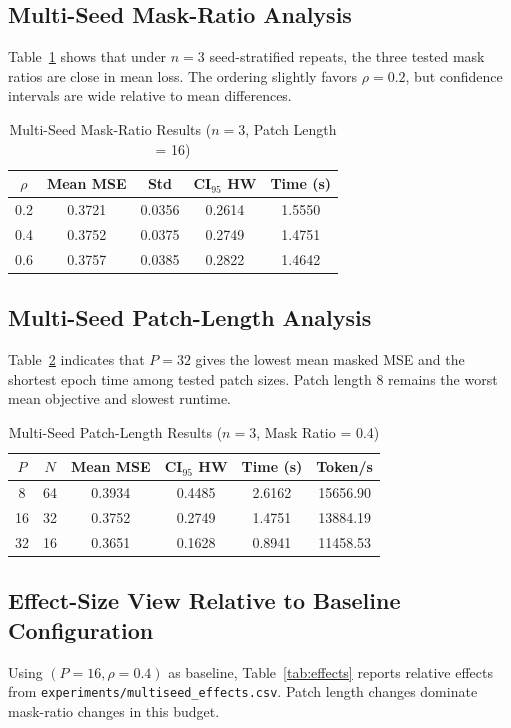 \documentclass[conference]{IEEEtran}
\begin{document}
\subsection{Multi-Seed Mask-Ratio Analysis}
Table~\ref{tab:mask_multiseed} shows that under $n=3$ seed-stratified repeats, the three tested mask ratios are close in mean loss. The ordering slightly favors $\rho=0.2$, but confidence intervals are wide relative to mean differences.

\begin{table}[t]
\caption{Multi-Seed Mask-Ratio Results ($n=3$, Patch Length = 16)}
\label{tab:mask_multiseed}
\centering
\begin{tabular}{ccccc}
\toprule
$\rho$ & Mean MSE & Std & CI$_{95}$ HW & Time (s) \\
\midrule
0.2 & 0.3721 & 0.0356 & 0.2614 & 1.5550 \\
0.4 & 0.3752 & 0.0375 & 0.2749 & 1.4751 \\
0.6 & 0.3757 & 0.0385 & 0.2822 & 1.4642 \\
\bottomrule
\end{tabular}
\end{table}

\subsection{Multi-Seed Patch-Length Analysis}
Table~\ref{tab:patch_multiseed} indicates that $P=32$ gives the lowest mean masked MSE and the shortest epoch time among tested patch sizes. Patch length 8 remains the worst mean objective and slowest runtime.

\begin{table}[t]
\caption{Multi-Seed Patch-Length Results ($n=3$, Mask Ratio = 0.4)}
\label{tab:patch_multiseed}
\centering
\scriptsize
\begin{tabular}{cccccc}
\toprule
$P$ & $N$ & Mean MSE & CI$_{95}$ HW & Time (s) & Token/s \\
\midrule
8  & 64 & 0.3934 & 0.4485 & 2.6162 & 15656.90 \\
16 & 32 & 0.3752 & 0.2749 & 1.4751 & 13884.19 \\
32 & 16 & 0.3651 & 0.1628 & 0.8941 & 11458.53 \\
\bottomrule
\end{tabular}
\end{table}

\subsection{Effect-Size View Relative to Baseline Configuration}
Using $(P=16,\rho=0.4)$ as baseline, Table~\ref{tab:effects} reports relative effects from \texttt{experiments/multiseed\_effects.csv}. Patch length changes dominate mask-ratio changes in this budget.
\end{document}
